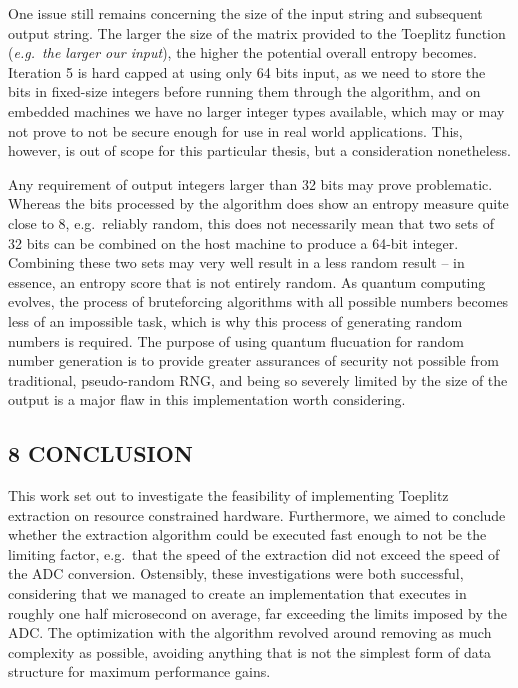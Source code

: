 One issue still remains concerning the size of the input string and subsequent output string. The larger the size of the matrix provided to the Toeplitz function (\emph{e.g.~the larger our input}), the higher the potential overall entropy becomes. Iteration 5 is hard capped at using only 64 bits input, as we need to store the bits in fixed-size integers before running them through the algorithm, and on embedded machines we have no larger integer types available, which may or may not prove to not be secure enough for use in real world applications. This, however, is out of scope for this particular thesis, but a consideration nonetheless.

Any requirement of output integers larger than 32 bits may prove problematic. Whereas the bits processed by the algorithm does show an entropy measure quite close to 8, e.g.~reliably random, this does not necessarily mean that two sets of 32 bits can be combined on the host machine to produce a 64-bit integer. Combining these two sets may very well result in a less random result -- in essence, an entropy score that is not entirely random. As quantum computing evolves, the process of bruteforcing algorithms with all possible numbers becomes less of an impossible task, which is why this process of generating random numbers is required. The purpose of using quantum flucuation for random number generation is to provide greater assurances of security not possible from traditional, pseudo-random RNG, and being so severely limited by the size of the output is a major flaw in this implementation worth considering.

\subsection{8 CONCLUSION}\label{conclusion}

This work set out to investigate the feasibility of implementing Toeplitz extraction on resource constrained hardware. Furthermore, we aimed to conclude whether the extraction algorithm could be executed fast enough to not be the limiting factor, e.g.~that the speed of the extraction did not exceed the speed of the ADC conversion. Ostensibly, these investigations were both successful, considering that we managed to create an implementation that executes in roughly one half microsecond on average, far exceeding the limits imposed by the ADC. The optimization with the algorithm revolved around removing as much complexity as possible, avoiding anything that is not the simplest form of data structure for maximum performance gains.


